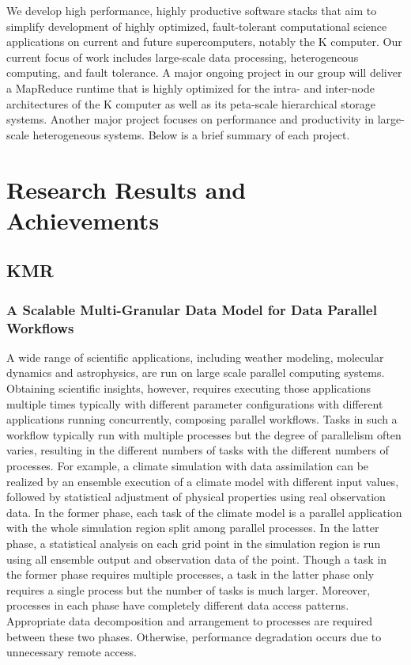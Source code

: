 \documentclass{book}
\begin{document}
We develop high performance, highly productive software stacks that aim to simplify development of highly optimized, fault-tolerant computational science applications on current and future supercomputers, notably the K computer. Our current focus of work includes large-scale data processing, heterogeneous computing, and fault tolerance. A major ongoing project in our group will deliver a MapReduce runtime that is highly optimized for the intra- and inter-node architectures of the K computer as well as its peta-scale hierarchical storage systems. Another major project focuses on performance and productivity in large-scale heterogeneous systems. Below is a brief summary of each project.


\section{Research Results and Achievements}

\subsection{KMR}

\subsubsection{A Scalable Multi-Granular Data Model for Data Parallel Workflows}

A wide range of scientific applications, including weather modeling, molecular dynamics and astrophysics, are run on large scale parallel computing systems.
Obtaining scientific insights, however, requires executing those applications multiple times typically with different parameter configurations with different applications running concurrently, composing parallel workflows.
Tasks in such a workflow typically run with multiple processes but the degree of parallelism often varies, resulting in the different numbers of tasks with the different numbers of processes.
For example, a climate simulation with data assimilation can be realized by an ensemble execution of a climate model with different input values, followed by statistical adjustment of physical properties using real observation data.
In the former phase, each task of the climate model is a parallel application with the whole simulation region split among parallel processes.
In the latter phase, a statistical analysis on each grid point in the simulation region is run using all ensemble output and observation data of the point.
Though a task in the former phase requires multiple processes, a task in the latter phase only requires a single process but the number of tasks is much larger.
Moreover, processes in each phase have completely different data access patterns.
Appropriate data decomposition and arrangement to processes are required between these two phases.
Otherwise, performance degradation occurs due to unnecessary remote access.
\end{document}
